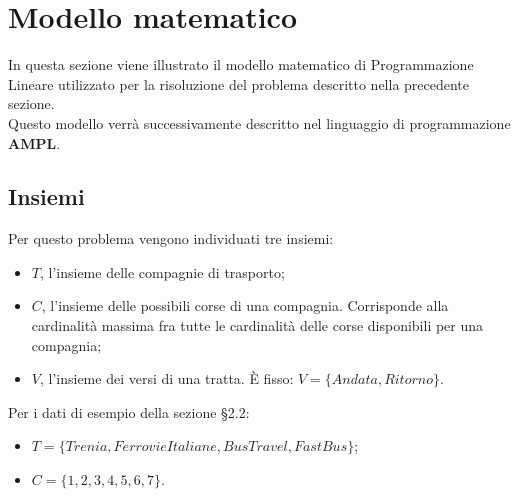 \documentclass[main.tex]{subfiles}
\begin{document}
\section{Modello matematico}
In questa sezione viene illustrato il modello matematico di Programmazione Lineare utilizzato per la risoluzione del problema descritto nella precedente sezione.\\
Questo modello verrà successivamente descritto nel linguaggio di programmazione \textbf{AMPL}.
\subsection*{Insiemi}
Per questo problema vengono individuati tre insiemi:
\begin{itemize}
    \item $T$, l'insieme delle compagnie di trasporto;
    \item $C$, l'insieme delle possibili corse di una compagnia. Corrisponde alla cardinalità massima fra tutte le cardinalità delle corse disponibili per una compagnia;
    \item $V$, l'insieme dei versi di una tratta. È fisso: $V = \{Andata, Ritorno \}$.
\end{itemize}
Per i dati di esempio della sezione §2.2:
\begin{itemize}
    \item $T = \{Trenia, FerrovieItaliane, BusTravel, FastBus\}$;
    \item $C = \{1, 2, 3, 4, 5, 6, 7\}$.
\end{itemize}
\end{document}
